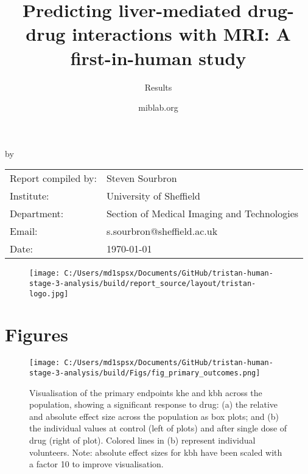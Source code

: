 \documentclass{epflreport}%
\begin{document}
%
\normalsize%
\frontmatter%
\title{Predicting liver{-}mediated drug{-}drug interactions with MRI: A first{-}in{-}human study}%
\subtitle{Results}%
\author{miblab.org}%
\subject{Internal report}%
%
%
%
\makecover%
\begin{titlepage}%
\begin{center}%
\makeatletter%
\largetitlestyle\fontsize{45}{45}\selectfont\@title%
\makeatother%
\linebreak%
\makeatletter%
\ifdefvoid{\@subtitle}{}{\bigskip\titlestyle\fontsize{20}{20}\selectfont\@subtitle}%
\makeatother%
\linebreak%
\bigskip%
\bigskip%
by%
\linebreak%
\bigskip%
\bigskip%
\makeatletter%
\largetitlestyle\fontsize{25}{25}\selectfont\@author%
\makeatother%
\vfill%
\large%
\begin{tabular}{ll}%
\hline%
Report compiled by: &Steven Sourbron\\%
Institute: &University of Sheffield\\%
Department: &Section of Medical Imaging and Technologies\\%
Email: &s.sourbron@sheffield.ac.uk\\%
Date: &\today\\%
\hline%
\end{tabular}%


\begin{figure}[b!]%
\centering%
\centering%
\texttt{[image: C:/Users/md1spsx/Documents/GitHub/tristan-human-stage-3-analysis/build/report\_source/layout/tristan-logo.jpg]}%
\end{figure}

%
\end{center}%
\end{titlepage}%
\newpage%
\tableofcontents%
\mainmatter%
\clearpage%
\chapter{Figures}%
\clearpage%


\begin{figure}[h!]%
\centering%
\texttt{[image: C:/Users/md1spsx/Documents/GitHub/tristan-human-stage-3-analysis/build/Figs/fig\_primary\_outcomes.png]}%
\caption{Visualisation of the primary endpoints khe and kbh across the population, showing a significant response to drug: (a) the relative and absolute effect size across the population as box plots; and (b) the individual values at control (left of plots) and after single dose of drug (right of plot). Colored lines in (b) represent individual volunteers. Note: absolute effect sizes for kbh have been scaled with a factor 10 to improve visualisation.}%
\end{figure}
\end{document}
